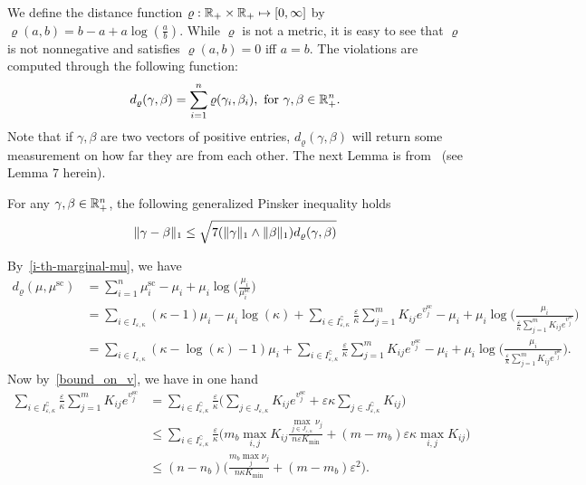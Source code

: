 We define the distance function $\varrho: {\mathbb{R}}_+ \times {\mathbb{R}}_+ \mapsto [0, \infty]$ by $\varrho(a,b) = b - a + a \log(\frac ab).$
While $\varrho$ is not a metric, it is easy to see that $\varrho$ is not nonnegative and satisfies $\varrho(a,b) =0$ iff $a=b$.
The violations are computed through the following function: 
\begin{equation*}
	d_{\varrho}(\gamma,\beta) = \sum_{i=1}^n \varrho(\gamma_i,\beta_i), \text{ for } \gamma, \beta \in {\mathbb{R}}^n_+.
\end{equation*}
Note that if $\gamma,\beta$ are two vectors of positive entries, $d_{\varrho}(\gamma,\beta)$ will return some measurement on how far they are from each other. The next Lemma is from~\cite{khalilabid2018} (see Lemma 7 herein).
\begin{lemma}
\label{lem:pinsker}
For any $\gamma, \beta \in {\mathbb{R}}^n_+$, the following generalized Pinsker inequality holds 
\begin{align*}
\|\gamma - \beta\|_1 \leq \sqrt{7 (\|\gamma\|_1\wedge \|\beta\|_1)d_{\varrho}(\gamma,\beta)}
\end{align*}
\end{lemma}
By~\eqref{i-th-marginal-mu}, we have
\begin{align*}
d_\varrho({\mu} ,{\mu}^{\text{sc}}) &= \sum_{i=1}^n  {\mu}^{\text{sc}}_i - {\mu}_i + {\mu}_i  \log\Big(\frac{{\mu}_i}{{\mu}^{\text{sc}}_i }\Big)\\
&= \sum_{i\in I_{\varepsilon,\kappa}} (\kappa-1)\mu_i - \mu_i\log(\kappa) + \sum_{i\in I^\complement_{\varepsilon,\kappa}}\frac \varepsilon\kappa\sum_{j=1}^m K_{ij} e^{v^{\text{sc}}_j} - \mu_i + \mu_i \log\Big(\frac{\mu_i}{\frac \varepsilon\kappa\sum_{j=1}^m K_{ij} e^{v^{\text{sc}}_j}}\Big)\\
&= \sum_{i\in I_{\varepsilon,\kappa}} (\kappa-\log(\kappa)-1)\mu_i  + \sum_{i\in I^\complement_{\varepsilon,\kappa}}\frac \varepsilon\kappa\sum_{j=1}^m K_{ij} e^{v^{\text{sc}}_j} - \mu_i + \mu_i \log\Big(\frac{\mu_i}{\frac \varepsilon\kappa\sum_{j=1}^m K_{ij} e^{v^{\text{sc}}_j}}\Big).
\end{align*}
Now by~\eqref{bound_on_v}, we have in one hand 
\begin{align*}
\sum_{i\in I^\complement_{\varepsilon,\kappa}}\frac \varepsilon\kappa\sum_{j=1}^m K_{ij} e^{v^{\text{sc}}_j}&= \sum_{i\in I^\complement_{\varepsilon,\kappa}}\frac \varepsilon\kappa \Big(\sum_{j\in J_{\varepsilon,\kappa}}K_{ij} e^{v^{\text{sc}}_j} + \varepsilon \kappa\sum_{j\in J^\complement_{\varepsilon,\kappa}}K_{ij}\Big)\\
&\leq \sum_{i\in I^\complement_{\varepsilon,\kappa}}\frac \varepsilon\kappa \Big(m_b \max_{i,j}K_{ij}\frac{\max_{j \in J_{\varepsilon,\kappa}} \nu_j}{n\varepsilon K_{\min}} + (m - m_b)\varepsilon\kappa\max_{i,j}K_{ij}\Big) \\
&\leq (n-n_b)\Big(\frac{m_b\max_{j} \nu_j}{n\kappa K_{\min}} + (m- m_b) \varepsilon^2\Big).
\end{align*}
